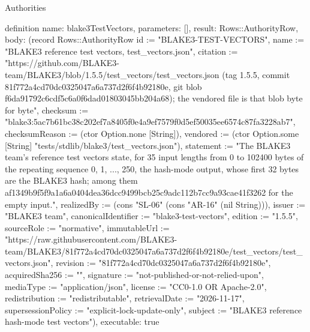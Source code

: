 \begin{lexlean}{Authorities}
\begin{semanticmodule}
definition{
  name: blake3TestVectors,
  parameters: [],
  result: Rows::AuthorityRow,
  body: (record Rows::AuthorityRow {id := "BLAKE3-TEST-VECTORS", name := "BLAKE3 reference test vectors, test_vectors.json", citation := "https://github.com/BLAKE3-team/BLAKE3/blob/1.5.5/test_vectors/test_vectors.json (tag 1.5.5, commit 81f772a4cd70dc0325047a6a737d2f6f4b92180e, git blob f6da91792c6cdf5c6a0f6dad01803045bb204a68); the vendored file is that blob byte for byte", checksum := "blake3:5ac7b61bc38c202ef7a8405f0e4a9ef7579f0d5ef50035ee6574c87fa3228ab7", checksumReason := (ctor Option.none [String]), vendored := (ctor Option.some [String] "tests/stdlib/blake3/test_vectors.json"), statement := "The BLAKE3 team's reference test vectors state, for 35 input lengths from 0 to 102400 bytes of the repeating sequence 0, 1, ..., 250, the hash-mode output, whose first 32 bytes are the BLAKE3 hash; among them af1349b9f5f9a1a6a0404dea36dcc9499bcb25c9adc112b7cc9a93cae41f3262 for the empty input.", realizedBy := (cons "SL-06" (cons "AR-16" (nil String))), issuer := "BLAKE3 team", canonicalIdentifier := "blake3-test-vectors", edition := "1.5.5", sourceRole := "normative", immutableUrl := "https://raw.githubusercontent.com/BLAKE3-team/BLAKE3/81f772a4cd70dc0325047a6a737d2f6f4b92180e/test_vectors/test_vectors.json", revision := "81f772a4cd70dc0325047a6a737d2f6f4b92180e", acquiredSha256 := "", signature := "not-published-or-not-relied-upon", mediaType := "application/json", license := "CC0-1.0 OR Apache-2.0", redistribution := "redistributable", retrievalDate := "2026-11-17", supersessionPolicy := "explicit-lock-update-only", subject := "BLAKE3 reference hash-mode test vectors"}),
  executable: true
}
\end{semanticmodule}
\end{lexlean}
